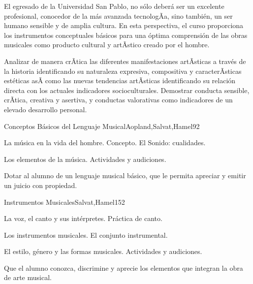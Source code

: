 \begin{syllabus}


\begin{justification}
El egresado de la Universidad San Pablo, no sólo deberá ser un excelente profesional, conocedor de la más avanzada tecnologÃ­a, sino también, un ser humano sensible y de amplia cultura. En esta perspectiva, el curso proporciona los instrumentos conceptuales básicos para una óptima comprensión de las obras musicales como producto cultural y artÃ­stico creado por el hombre.
\end{justification}

\begin{goals}
\item Analizar de manera crÃ­tica las diferentes manifestaciones artÃ­sticas a través de la historia identificando su naturaleza expresiva, compositiva y caracterÃ­sticas estéticas asÃ­ como las nuevas tendencias artÃ­sticas identificando su relación directa con los actuales indicadores socioculturales. Demostrar conducta sensible, crÃ­tica, creativa y asertiva, y conductas valorativas como indicadores de un elevado desarrollo personal.
\end{goals}

\begin{outcomes}
\end{outcomes}

\begin{unit}{Conceptos Básicos del Lenguaje Musical}{Aopland,Salvat,Hamel}{9}{2}
\begin{topics}
	\item La música en la vida del hombre. Concepto. El Sonido: cualidades.
	\item Los elementos de la música. Actividades y audiciones.
\end{topics}
\begin{unitgoals}
	\item Dotar al alumno de un lenguaje musical básico, que le permita apreciar y emitir un juicio con propiedad.
\end{unitgoals}
\end{unit}

\begin{unit}{Instrumentos Musicales}{Salvat,Hamel}{15}{2}
\begin{topics}
	\item La voz, el canto y sus intérpretes. Práctica de canto.
	\item Los instrumentos musicales. El conjunto instrumental.
	\item El estilo, género y las formas musicales. Actividades y audiciones.
\end{topics}
\begin{unitgoals}
	\item Que el alumno conozca, discrimine y aprecie los elementos que integran la obra de arte musical.
\end{unitgoals}
\end{unit}


\end{syllabus}
